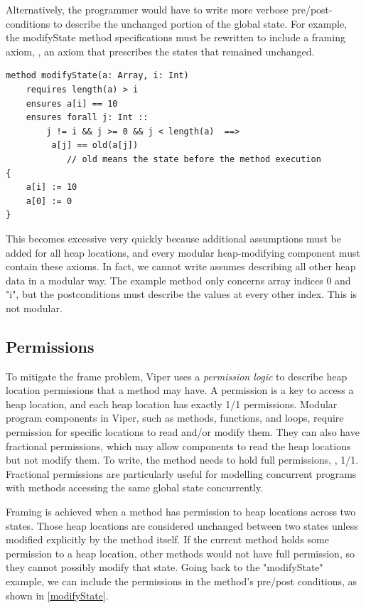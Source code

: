 \documentclass[msc,oneside]{ubcthesis}
\theoremstyle{definition}
\begin{document}
Alternatively, the programmer would have to write more verbose pre/post-conditions to describe the unchanged portion of the global state. For example, the modifyState method specifications must be rewritten to include a framing axiom, \ie, an axiom that prescribes the states that remained unchanged.
\begin{minipage}{\linewidth}
\begin{lstlisting}
method modifyState(a: Array, i: Int)
    requires length(a) > i
    ensures a[i] == 10
    ensures forall j: Int ::   
        j != i && j >= 0 && j < length(a)  ==> 
         a[j] == old(a[j])  
            // old means the state before the method execution 
{
    a[i] := 10
    a[0] := 0
}
\end{lstlisting}
\end{minipage}
This becomes excessive very quickly because additional assumptions must be added for all heap locations, and every modular heap-modifying component must contain these axioms. In fact, we cannot write assumes describing all other heap data in a modular way. The example method only concerns array indices 0 and "i", but the postconditions must describe the values at every other index. This is not modular.

\subsection{Permissions}
To mitigate the frame problem, Viper uses a \emph{permission logic} to describe heap location permissions that a method may have. A permission is a key to access a heap location, and each heap location has exactly 1/1 permissions. Modular program components in Viper, such as methods, functions, and loops, require permission for specific locations to read and/or modify them. They can also have fractional permissions, which may allow components to read the heap locations but not modify them. To write, the method needs to hold full permissions, \ie, 1/1. Fractional permissions are particularly useful for modelling concurrent programs with methods accessing the same global state concurrently.

Framing is achieved when a method has permission to heap locations across two states. Those heap locations are considered unchanged between two states unless modified explicitly by the method itself. If the current method holds some permission to a heap location, other methods would not have full permission, so they cannot possibly modify that state. 
Going back to the "modifyState" example, we can include the permissions in the method's pre/post conditions, as shown in \cref{modifyState}. 
\end{document}
